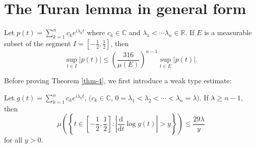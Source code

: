 \section{The Turan lemma in general form}
\begin{theorem}\label{thm-4}
   Let $p(t)=\sum_{k=1}^{n} c_k e^{i\lambda_kt}$ where $c_k\in \mathbb{C}$ and $\lambda_1<\cdots\lambda_n \in \mathbb{R}$. If $E $ is a measurable subset of the segment $I=\left[ -\frac{1}{2},\frac{1}{2} \right] $, then
   \[
     \sup_{t\in I}\left| p(t) \right| \le \left( \frac{316}{\mu(E)} \right) ^{n-1}\sup_{t\in E}\left| p(t) \right| .
   \] 
 \end{theorem} 
 Before proving Theorem \ref{thm-4}, we first introduce a weak type estimate:
 \begin{lemma}\label{lemma-3}
   Let $g(t)=\sum_{k=1}^{n} c_k e^{i\lambda_kt}$, $(c_k\in \mathbb{C}$, $0=\lambda_1<\lambda_2<\cdots<\lambda_n=\lambda)$. If $\lambda \ge n-1$, then 
   \[
     \mu\left( \left\{ t\in \left[ -\frac{1}{2},\frac{1}{2} \right] :\left|  \frac{\mathrm{d}}{\mathrm{d}t}\log g(t) \right| >y \right\}  \right) \le \frac{29\lambda}{y}
   \] 
   for all $y>0$.
\end{lemma}
